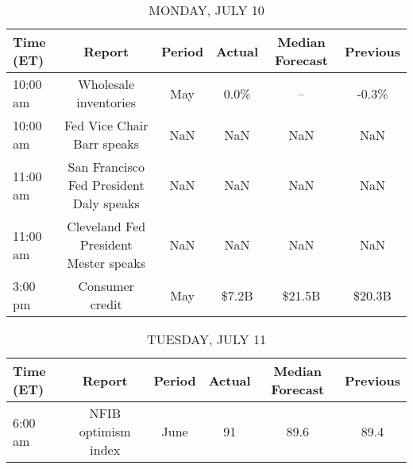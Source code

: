 \documentclass{article}%
\begin{document}
%
\normalsize%


\begin{table}[htbp]%
\caption{MONDAY, JULY 10}%
\centering%
\begin{adjustbox}{width=1\textwidth}%
\begin{tabular}{lccccc}
\toprule
Time (ET) &                                  Report & Period & Actual & Median Forecast & Previous \\
\midrule
 10:00 am &                   Wholesale inventories &    May &   0.0\% &              -- &    -0.3\% \\
 10:00 am &              Fed Vice Chair Barr speaks &    NaN &    NaN &             NaN &      NaN \\
 11:00 am & San Francisco Fed President Daly speaks &    NaN &    NaN &             NaN &      NaN \\
 11:00 am &   Cleveland Fed President Mester speaks &    NaN &    NaN &             NaN &      NaN \\
  3:00 pm &                         Consumer credit &    May &  \$7.2B &          \$21.5B &   \$20.3B \\
\bottomrule
\end{tabular}
%
\end{adjustbox}%
\end{table}

%


\begin{table}[htbp]%
\caption{TUESDAY, JULY 11}%
\centering%
\begin{adjustbox}{width=1\textwidth}%
\begin{tabular}{lccccc}
\toprule
Time (ET) &              Report & Period & Actual & Median Forecast & Previous \\
\midrule
  6:00 am & NFIB optimism index &   June &     91 &            89.6 &     89.4 \\
\bottomrule
\end{tabular}
%
\end{adjustbox}%
\end{table}

%
\end{document}
